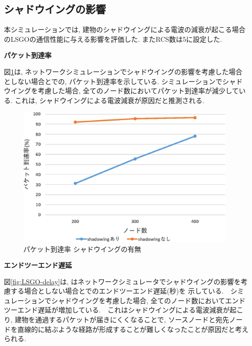 \documentclass[10pt]{jreport}
\begin{document}
\subsection{シャドウイングの影響}
本シミュレーションでは, 建物のシャドウイングによる電波の減衰が起こる場合のLSGOの通信性能に与える影響を評価した.
またRCS数は5に設定した.

\par
\vspace{5mm}
\noindent
\textbf{パケット到達率}
\vspace{5mm}

図\ref{fig:LSGO-PDR}は, ネットワークシミュレーションでシャドウイングの影響を考慮した場合としない場合とでの, パケット到達率を示している.
シミュレーションでシャドウイングを考慮した場合, 全てのノード数においてパケット到達率が減少している. これは, シャドウイングによる電波減衰が原因だと推測される.



\begin{figure}[!ht]
	\centering
	\includegraphics[width=110mm]{figures/LSGO_PDR.eps}
	\caption{パケット到達率 シャドウイングの有無}
	\label{fig:LSGO-PDR}
\end{figure}

\par
\vspace{5mm}
\noindent
\textbf{エンドツーエンド遅延}
\vspace{5mm}

図\ref{fig:LSGO-delay}は, はネットワークシミュレータでシャドウイングの影響を考慮する場合としない場合とでのエンドツーエンド遅延(秒)を
示している.　シミュレーションでシャドウイングを考慮した場合, 全てのノード数においてエンドツーエンド遅延が増加している.　これはシャドウイングによる電波減衰が起こり, 建物を通過するパケットが届きにくくなることで,  ソースノードと宛先ノードを直線的に結ぶような経路が形成することが難しくなったことが原因だと考えられる.
\end{document}

